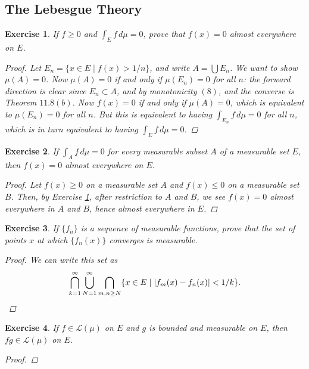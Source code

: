 \documentclass[10pt,letterpaper]{amsart}
\newtheorem{exercise}{Exercise}[section]
\theoremstyle{definition}
\theoremstyle{remark}
\numberwithin{equation}{exercise}
\begin{document}
\begin{multicols}{2}
  \section{The Lebesgue Theory}
  \begin{exercise}\label{11.1}
    If $f \ge 0$ and $\int_E f\,d\mu = 0$, prove that $f(x) = 0$ almost
    everywhere on $E$.
    \begin{proof}
      Let $E_n = \{ x \in E \mid f(x) > 1/n \}$, and write $A = \bigcup E_n$.
      We want to show $\mu(A)= 0$. Now $\mu(A) = 0$ if and only if
      $\mu(E_n) = 0$ for all $n$: the forward direction is clear since $E_n
      \subset A$, and by monotonicity $(8)$, and the converse is Theorem
      $11.8(b)$. Now $f(x) = 0$ if and only if $\mu(A) = 0$, which is equivalent
      to $\mu(E_n) = 0$ for all $n$. But this is equivalent to having
      $\int_{E_n} f\,d\mu = 0$ for all $n$, which is in turn equivalent to
      having $\int_E f \,d\mu = 0$.
    \end{proof}
  \end{exercise}
  \begin{exercise}\label{11.2}
    If $\int_A f\,d\mu = 0$ for every measurable subset $A$ of a measurable set
    $E$, then $f(x) = 0$ almost everywhere on $E$.
    \begin{proof}
      Let $f(x) \ge 0$ on a measurable set $A$ and $f(x) \le 0$ on a measurable set
      $B$. Then, by Exercise \ref{11.1}, after restriction to $A$ and $B$,
      we see $f(x) = 0$ almost everywhere in $A$ and $B$, hence almost everywhere
      in $E$.
    \end{proof}
  \end{exercise}
  \begin{exercise}
    If $\{f_n\}$ is a sequence of measurable functions, prove that the set of
    points $x$ at which $\{f_n(x)\}$ converges is measurable.
    \begin{proof}
      We can write this set as
      \begin{equation*}
        \bigcap_{k=1}^\infty \bigcup_{N=1}^\infty \bigcap_{m,n \ge N}
        \{x \in E \mid \lvert f_m(x) - f_n(x) \rvert < 1/k\}.\qedhere
      \end{equation*}
    \end{proof}
  \end{exercise}
  \begin{exercise}
    If $f \in \mathscr{L}(\mu)$ on $E$ and $g$ is bounded and measurable on $E$,
    then $fg \in \mathscr{L}(\mu)$ on $E$.
    \begin{proof}

\end{proof}
\end{exercise}
\end{multicols}
\end{document}
